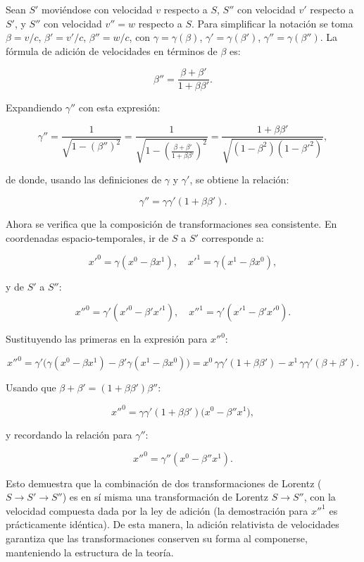 

Sean $S'$ moviéndose con velocidad $v$ respecto a $S$, $S''$ con velocidad $v'$ respecto a $S'$, y $S''$ con velocidad $v'' = w$ respecto a $S$. Para simplificar la notación se toma $\beta = v/c$, $\beta' = v'/c$, $\beta'' = w/c$, con $\gamma = \gamma(\beta)$, $\gamma' = \gamma(\beta')$, $\gamma'' = \gamma(\beta'')$. La fórmula de adición de velocidades en términos de $\beta$ es:

$$
\beta'' = \frac{\beta + \beta'}{1 + \beta\beta'}.
$$

Expandiendo $\gamma''$ con esta expresión:

$$
\gamma'' = \frac{1}{\sqrt{1 - (\beta'')^2}} = \frac{1}{\sqrt{1 - \left(\frac{\beta + \beta'}{1 + \beta\beta'}\right)^2}} = \frac{1 + \beta\beta'}{\sqrt{(1 - \beta^2)(1 - \beta'^2)}},
$$

de donde, usando las definiciones de $\gamma$ y $\gamma'$, se obtiene la relación:

$$
\gamma'' = \gamma\gamma'(1 + \beta\beta').
$$

Ahora se verifica que la composición de transformaciones sea consistente. En coordenadas espacio-temporales, ir de $S$ a $S'$ corresponde a:

$$
x'^0 = \gamma(x^0 - \beta x^1), \quad x'^1 = \gamma(x^1 - \beta x^0),
$$

y de $S'$ a $S''$:

$$
x''^0 = \gamma'(x'^0 - \beta' x'^1), \quad x''^1 = \gamma'(x'^1 - \beta' x'^0).
$$

Sustituyendo las primeras en la expresión para $x''^0$:

$$
x''^0 = \gamma'\big(\gamma(x^0 - \beta x^1) - \beta'\gamma(x^1 - \beta x^0)\big) = x^0\,\gamma\gamma'(1 + \beta\beta') - x^1\,\gamma\gamma'(\beta + \beta').
$$

Usando que $\beta + \beta' = (1 + \beta\beta')\beta''$:

$$
x''^0 = \gamma\gamma'(1 + \beta\beta')\big(x^0 - \beta'' x^1\big),
$$

y recordando la relación para $\gamma''$:

$$
x''^0 = \gamma''(x^0 - \beta'' x^1).
$$

Esto demuestra que la combinación de dos transformaciones de Lorentz ($S \to S' \to S''$) es en sí misma una transformación de Lorentz $S \to S''$, con la velocidad compuesta dada por la ley de adición (la demostración para $x''^1$ es prácticamente idéntica). De esta manera, la adición relativista de velocidades garantiza que las transformaciones conserven su forma al componerse, manteniendo la estructura de la teoría.


